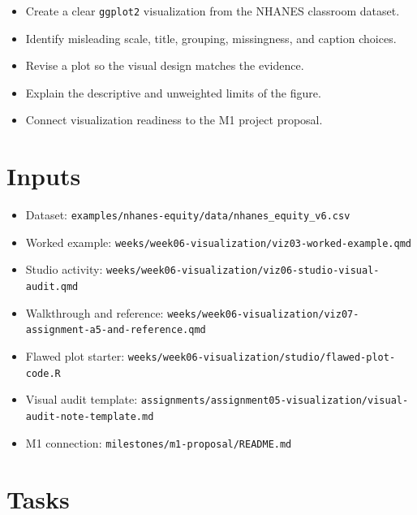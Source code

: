 \documentclass[
  letterpaper,
  DIV=11,
  numbers=noendperiod,
  oneside]{scrreprt}
\providecommand{\tightlist}{%
  \setlength{\itemsep}{0pt}\setlength{\parskip}{0pt}}
\begin{document}
\begin{itemize}
\tightlist
\item
  Create a clear \texttt{ggplot2} visualization from the NHANES
  classroom dataset.
\item
  Identify misleading scale, title, grouping, missingness, and caption
  choices.
\item
  Revise a plot so the visual design matches the evidence.
\item
  Explain the descriptive and unweighted limits of the figure.
\item
  Connect visualization readiness to the M1 project proposal.
\end{itemize}

\section{Inputs}\label{inputs-6}

\begin{itemize}
\tightlist
\item
  Dataset: \texttt{examples/nhanes-equity/data/nhanes\_equity\_v6.csv}
\item
  Worked example:
  \texttt{weeks/week06-visualization/viz03-worked-example.qmd}
\item
  Studio activity:
  \texttt{weeks/week06-visualization/viz06-studio-visual-audit.qmd}
\item
  Walkthrough and reference:
  \texttt{weeks/week06-visualization/viz07-assignment-a5-and-reference.qmd}
\item
  Flawed plot starter:
  \texttt{weeks/week06-visualization/studio/flawed-plot-code.R}
\item
  Visual audit template:
  \texttt{assignments/assignment05-visualization/visual-audit-note-template.md}
\item
  M1 connection: \texttt{milestones/m1-proposal/README.md}
\end{itemize}

\section{Tasks}\label{tasks-4}
\end{document}
